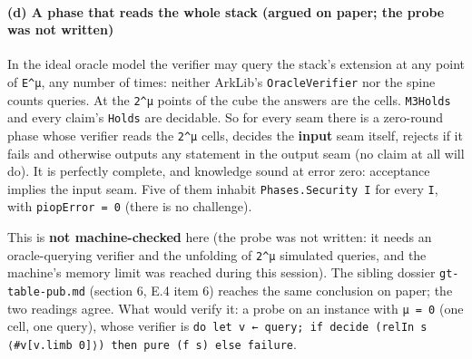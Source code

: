 \paragraph{(d) A phase that reads the whole stack (argued on paper; the probe was not written)}

In the ideal oracle model the verifier may query the stack's extension at any point of \texttt{E\textasciicircum{}μ}, any number of times: neither ArkLib's \texttt{OracleVerifier} nor the spine counts queries. At the \texttt{2\textasciicircum{}μ} points of the cube the answers are the cells. \texttt{M3Holds} and every claim's \texttt{Holds} are decidable. So for every seam there is a zero-round phase whose verifier reads the \texttt{2\textasciicircum{}μ} cells, decides the \textbf{input} seam itself, rejects if it fails and otherwise outputs any statement in the output seam (no claim at all will do). It is perfectly complete, and knowledge sound at error zero: acceptance implies the input seam. Five of them inhabit \texttt{Phases.\allowbreak{}Security I} for every \texttt{I}, with \texttt{piopError = 0} (there is no challenge).

This is \textbf{not machine-checked} here (the probe was not written: it needs an oracle-querying verifier and the unfolding of \texttt{2\textasciicircum{}μ} simulated queries, and the machine's memory limit was reached during this session). The sibling dossier \texttt{gt-{}table-{}pub.\allowbreak{}md} (section 6, E.4 item 6) reaches the same conclusion on paper; the two readings agree. What would verify it: a probe on an instance with \texttt{μ = 0} (one cell, one query), whose verifier is \texttt{d\allowbreak{}o\allowbreak{} l\allowbreak{}e\allowbreak{}t\allowbreak{} v\allowbreak{} ←\allowbreak{} q\allowbreak{}u\allowbreak{}e\allowbreak{}r\allowbreak{}y\allowbreak{};\allowbreak{} i\allowbreak{}f\allowbreak{} d\allowbreak{}e\allowbreak{}c\allowbreak{}i\allowbreak{}d\allowbreak{}e\allowbreak{} (\allowbreak{}r\allowbreak{}e\allowbreak{}l\allowbreak{}I\allowbreak{}n\allowbreak{} s\allowbreak{} ⟨\allowbreak{}\#\allowbreak{}v\allowbreak{}[\allowbreak{}v\allowbreak{}.\allowbreak{}l\allowbreak{}i\allowbreak{}m\allowbreak{}b\allowbreak{} 0\allowbreak{}]\allowbreak{}⟩\allowbreak{})\allowbreak{} t\allowbreak{}h\allowbreak{}e\allowbreak{}n\allowbreak{} p\allowbreak{}u\allowbreak{}r\allowbreak{}e\allowbreak{} (\allowbreak{}f\allowbreak{} s\allowbreak{})\allowbreak{} e\allowbreak{}l\allowbreak{}s\allowbreak{}e\allowbreak{} f\allowbreak{}a\allowbreak{}i\allowbreak{}l\allowbreak{}u\allowbreak{}r\allowbreak{}e}.

